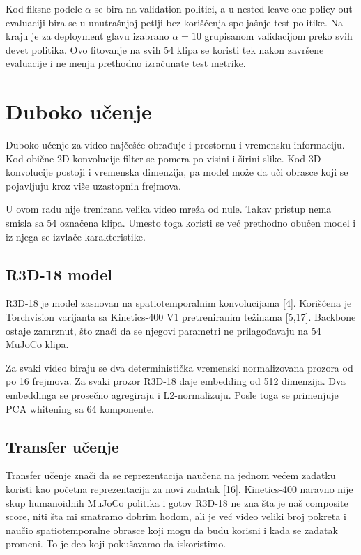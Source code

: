 \documentclass[12pt,a4paper]{report}
\begin{document}
Kod fiksne podele $\alpha$ se bira na validation politici, a u nested
leave-one-policy-out evaluaciji bira se u unutrašnjoj petlji bez korišćenja
spoljašnje test politike. Na kraju je za deployment glavu izabrano
$\alpha=10$ grupisanom validacijom preko svih devet politika. Ovo fitovanje na
svih 54 klipa se koristi tek nakon završene evaluacije i ne menja prethodno
izračunate test metrike.

\section{Duboko učenje}

Duboko učenje za video najčešće obrađuje i prostornu i vremensku informaciju.
Kod obične 2D konvolucije filter se pomera po visini i širini slike. Kod 3D
konvolucije postoji i vremenska dimenzija, pa model može da uči obrasce koji se
pojavljuju kroz više uzastopnih frejmova.

U ovom radu nije trenirana velika video mreža od nule. Takav pristup nema
smisla sa 54 označena klipa. Umesto toga koristi se već prethodno obučen model i
iz njega se izvlače karakteristike.

\subsection{R3D-18 model}

R3D-18 je model zasnovan na spatiotemporalnim konvolucijama [4]. Korišćena je
Torchvision varijanta sa Kinetics-400 V1 pretreniranim težinama [5,17]. Backbone
ostaje zamrznut, što znači da se njegovi parametri ne prilagođavaju na 54
MuJoCo klipa.

Za svaki video biraju se dva deterministička vremenski normalizovana prozora od
po 16 frejmova. Za svaki prozor R3D-18 daje embedding od 512 dimenzija. Dva
embeddinga se prosečno agregiraju i L2-normalizuju. Posle toga se primenjuje PCA
whitening sa 64 komponente.

\subsection{Transfer učenje}

Transfer učenje znači da se reprezentacija naučena na jednom većem zadatku
koristi kao početna reprezentacija za novi zadatak [16]. Kinetics-400 naravno nije
skup humanoidnih MuJoCo politika i gotov R3D-18 ne zna šta je naš composite
score, niti šta mi smatramo dobrim hodom, ali je već video veliki broj pokreta i
naučio spatiotemporalne obrasce koji mogu da budu korisni i kada se zadatak
promeni. To je deo koji pokušavamo da iskoristimo.
\end{document}
